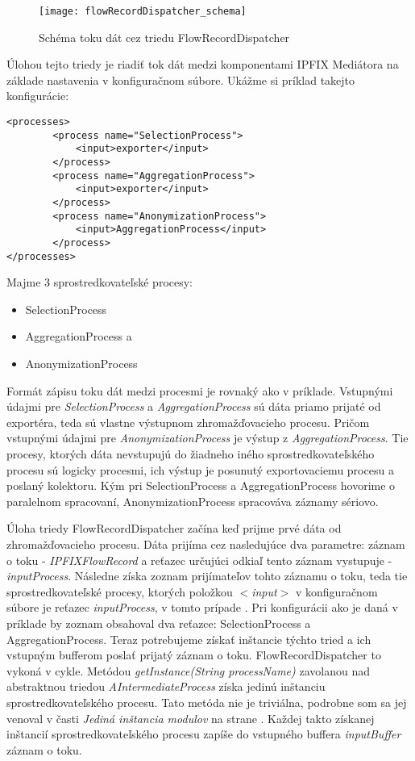 \begin{figure}[ht!]
\centering
\texttt{[image: flowRecordDispatcher\_schema]}
\caption{Schéma toku dát cez triedu FlowRecordDispatcher}\label{o:flowRecordDispatcher_schema}
\end{figure}

Úlohou tejto triedy je riadiť tok dát medzi komponentami IPFIX Mediátora na základe nastavenia v 
konfiguračnom súbore.
Ukážme si príklad takejto konfigurácie:
\begin{verbatim}
<processes>
        <process name="SelectionProcess">
            <input>exporter</input>
        </process>
        <process name="AggregationProcess">
            <input>exporter</input>
        </process>
        <process name="AnonymizationProcess">
            <input>AggregationProcess</input>
        </process>
</processes>
\end{verbatim}

Majme 3 sprostredkovateľské procesy: 
\begin{itemize}
\item SelectionProcess
\item AggregationProcess a 
\item AnonymizationProcess 
\end{itemize}

Formát zápisu toku dát medzi procesmi je rovnaký ako v príklade. Vstupnými údajmi pre 
\emph{SelectionProcess} a \emph{AggregationProcess} sú dáta priamo prijaté od exportéra, teda sú 
vlastne výstupnom  
zhromažďovacieho procesu. Pričom vstupnými údajmi pre \emph{AnonymizationProcess} je výstup 
z \emph{AggregationProcess}. Tie procesy, ktorých dáta nevstupujú do žiadneho iného sprostredkovateľského 
procesu sú logicky  procesmi, ich výstup je posunutý exportovaciemu procesu a poslaný 
kolektoru. Kým pri SelectionProcess a AggregationProcess hovorime o paralelnom spracovaní, 
AnonymizationProcess spracováva záznamy sériovo.

Úloha triedy FlowRecordDispatcher začína keď prijme prvé dáta od zhromažďovacieho procesu. Dáta prijíma 
cez nasledujúce dva 
parametre: záznam o toku - \emph{IPFIXFlowRecord} a reťazec určujúci odkiaľ tento záznam vystupuje - 
\emph{inputProcess}.
Následne získa zoznam prijímateľov tohto záznamu o toku, teda tie sprostredkovateľské procesy, 
ktorých položkou \emph{$<$input$>$} v konfiguračnom súbore je reťazec \emph{inputProcess}, v tomto 
prípade . Pri konfigurácii ako je daná v príklade by zoznam obsahoval dva reťazce: SelectionProcess
a AggregationProcess. Teraz potrebujeme získať inštancie týchto tried a ich vstupným bufferom poslať 
prijatý záznam o toku. FlowRecordDispatcher to vykoná v cykle. 
Metódou \emph{getInstance(String processName)} zavolanou nad
abstraktnou triedou \emph{AIntermediateProcess} získa jedinú inštanciu sprostredkovateľského procesu. 
Tato metóda nie je triviálna, podrobne som sa jej venoval v časti 
\emph{Jediná inštancia modulov} na strane \pageref{sec:singleton}. Každej takto získanej 
inštancií sprostredkovateľského procesu zapíše do vstupného buffera \emph{inputBuffer} záznam o toku.

